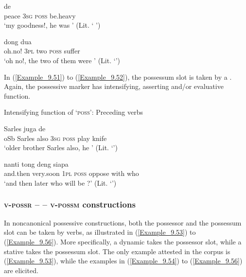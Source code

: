 \ea
\label{Example_9.49}
 {de} {} {}\\ %
 peace  \textsc{3sg}  \textsc{poss}  be.heavy\\
\glt 
‘my goodness!, he was ’ (Lit. ‘ ’) \textstyleExampleSource{[081025-009b-Cv.0041]}
\z

\ea
\label{Example_9.50}
 {dong} {dua} {} {}\\ %
 oh.no!  \textsc{3pl}  two  \textsc{poss}  suffer\\
\glt 
‘oh no!, the two of them were ’ (Lit. ‘’) \textstyleExampleSource{[081025-006-Cv.0059]}
\z


In (\ref{Example_9.51}) to (\ref{Example_9.52}), the possessum slot is taken by a  . Again, the possessive marker has intensifying, asserting and/or evaluative function.



\begin{styleExampleTitle}
Intensifying function of  ‘\textsc{poss}’: Preceding  verbs
\end{styleExampleTitle}

\ea
\label{Example_9.51}
 {Sarles} {juga} {de} {} {} {}\\ %
 oSb  Sarles  also  \textsc{3sg}  \textsc{poss}  play  knife\\
\glt 
‘older brother Sarles also, he ’ (Lit. ‘’) \textstyleExampleSource{[081023-001-Cv.0009]}
\z

\ea
\label{Example_9.52}
 {nanti} {tong} {} {} {deng} {siapa}\\ %
 and.then  very.soon  \textsc{1pl}  \textsc{poss}  oppose  with  who\\
\glt
‘and then later who will be ?’ (Lit. ‘’) \textstyleExampleSource{[081109-001-Cv.0136]}
\z


\subsubsection[v{}-possr – punya – v{}-possm constructions]{\textsc{v-possr} –  – \textsc{v-possm} constructions}
\label{Para_9.3.3.3}
In noncanonical possessive constructions, both the possessor and the possessum slot can be taken by verbs, as illustrated in (\ref{Example_9.53}) to (\ref{Example_9.56}). More specifically, a dynamic  takes the possessor slot, while a stative  takes the possessum slot. The only example attested in the corpus is (\ref{Example_9.53}), while the examples in (\ref{Example_9.54}) to (\ref{Example_9.56}) are elicited.



